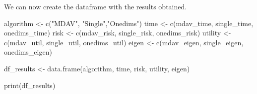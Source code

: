 \documentclass[
]{article}
\newenvironment{Shaded}{\begin{snugshade}}{\end{snugshade}}
\newcommand{\FunctionTok}[1]{\textcolor[rgb]{0.00,0.00,0.00}{#1}}
\newcommand{\NormalTok}[1]{#1}
\newcommand{\OtherTok}[1]{\textcolor[rgb]{0.56,0.35,0.01}{#1}}
\newcommand{\SpecialCharTok}[1]{\textcolor[rgb]{0.00,0.00,0.00}{#1}}
\newcommand{\StringTok}[1]{\textcolor[rgb]{0.31,0.60,0.02}{#1}}
\begin{document}
\begin{Shaded}
\end{Shaded}

We can now create the dataframe with the results obtained.

\begin{Shaded}
\begin{Highlighting}[]
\NormalTok{algorithm }\OtherTok{\textless{}{-}} \FunctionTok{c}\NormalTok{(}\StringTok{"MDAV"}\NormalTok{, }\StringTok{"Single"}\NormalTok{,}\StringTok{"Onedims"}\NormalTok{)}
\NormalTok{time }\OtherTok{\textless{}{-}} \FunctionTok{c}\NormalTok{(mdav\_time, single\_time, onedims\_time)}
\NormalTok{risk }\OtherTok{\textless{}{-}} \FunctionTok{c}\NormalTok{(mdav\_risk, single\_risk, onedims\_risk)}
\NormalTok{utility }\OtherTok{\textless{}{-}} \FunctionTok{c}\NormalTok{(mdav\_util, single\_util, onedims\_util)}
\NormalTok{eigen }\OtherTok{\textless{}{-}} \FunctionTok{c}\NormalTok{(mdav\_eigen, single\_eigen, onedims\_eigen)}

\NormalTok{df\_results }\OtherTok{\textless{}{-}} \FunctionTok{data.frame}\NormalTok{(algorithm, time, risk, utility, eigen)}

\FunctionTok{print}\NormalTok{(df\_results)}
\end{Highlighting}
\end{Shaded}
\end{document}
